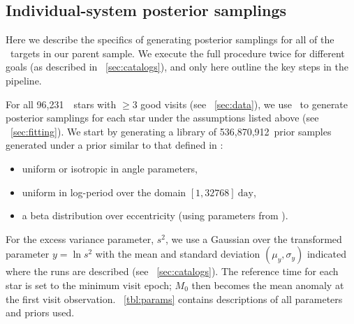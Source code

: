 \documentclass[modern, letterpaper]{aastex62}
\newcommand{\apogee}{\project{\acronym{APOGEE}}}
\newcommand{\thejoker}{\project{The~Joker}}
\newcommand{\nprior}{536,870,912}
\newcommand{\nstars}{96,231}
\begin{document}
\subsection{Individual-system posterior samplings}
\label{sec:samplings}

Here we describe the specifics of generating posterior samplings for all of the
\apogee\ targets in our parent sample.
We execute the full procedure twice for different goals (as described in
\sectionname~\ref{sec:catalogs}), and only here outline the key steps in the
pipeline.

For all \nstars\ \apogee\ stars with $\geq 3$ good visits (see
\sectionname~\ref{sec:data}), we use \thejoker\ to generate posterior samplings
for each star under the assumptions listed above (see
\sectionname~\ref{sec:fitting}).
We start by generating a library of \nprior\ prior samples generated under a
prior similar to that defined in \citet{Price-Whelan:2017}:
\begin{itemize}
    \item uniform or isotropic in angle parameters,
    \item uniform in log-period over the domain $[1,32768]~\textrm{day}$,
    \item a beta distribution over eccentricity (using parameters from
    \citealt{Kipping:2013}).
\end{itemize}
For the excess variance parameter, $s^2$, we use a Gaussian over the transformed
parameter $y = \ln s^2$ with the mean and standard deviation $(\mu_y, \sigma_y)$
indicated where the runs are described (see \sectionname~\ref{sec:catalogs}).
The reference time for each star is set to the minimum visit epoch; $M_0$ then
becomes the mean anomaly at the first visit observation.
\tablename~\ref{tbl:params} contains descriptions of all parameters and priors
used.
\end{document}
